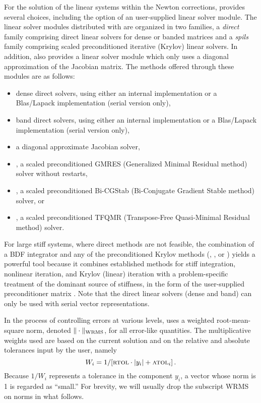 For the solution of the linear systems within the Newton corrections, 
{\cvodes} provides several choices, including the option of an user-supplied
linear solver module. The linear solver modules distributed with {\sundials}
are organized in two families, a {\em direct} family comprising direct linear 
solvers for dense or banded matrices and a {\em spils} family comprising
scaled preconditioned iterative (Krylov) linear solvers. 
In addition, {\cvodes} also provides a linear solver module which only uses
a diagonal approximation of the Jacobian matrix. 
The methods offered through these modules are as follows:
\begin{itemize}
\item dense direct solvers, using either an internal implementation or 
  a Blas/Lapack implementation (serial version only),
\item band direct solvers, using either an internal implementation or 
  a Blas/Lapack implementation (serial version only),
\item a diagonal approximate Jacobian solver,
\item {\spgmr}, a scaled preconditioned GMRES (Generalized Minimal Residual method)
      solver without restarts,
\item {\spbcg}, a scaled preconditioned Bi-CGStab (Bi-Conjugate Gradient Stable
      method) solver, or
\item {\sptfqmr}, a scaled preconditioned TFQMR (Transpose-Free Quasi-Minimal
       Residual method) solver.
\end{itemize}
For large stiff systems, where direct methods are not feasible, the
combination of a BDF integrator and any of the preconditioned Krylov
methods ({\spgmr}, {\spbcg}, or {\sptfqmr}) yields a powerful tool
because it combines established methods for stiff integration,
nonlinear iteration, and Krylov (linear) iteration with a
problem-specific treatment of the dominant source of stiffness, in the
form of the user-supplied preconditioner matrix \cite{BrHi:89}.
Note that the direct linear solvers (dense and band) can only be 
used with serial vector representations.

In the process of controlling errors at various levels, {\cvodes} uses
a weighted root-mean-square norm, denoted
$\|\cdot\|_{\mbox{\scriptsize WRMS}}$, for all error-like quantities.
The multiplicative weights used are based on the current solution and
on the relative and absolute tolerances input by the user, namely
\begin{equation}\label{e:errwt}
 W_i = 1 / [ \mbox{\sc rtol} \cdot |y_i| + \mbox{\sc atol}_i ] \, .
\end{equation}
Because $1/W_i$ represents a tolerance in the component $y_i$, a vector
whose norm is 1 is regarded as ``small.''  For brevity, we will
usually drop the subscript WRMS on norms in what follows.

